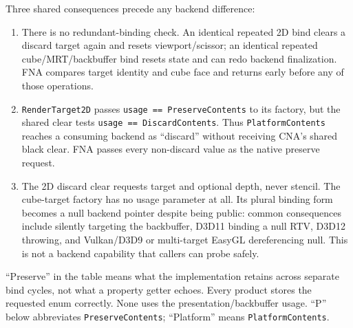 Three shared consequences precede any backend difference:

\begin{enumerate}
  \item There is no redundant-binding check. An identical repeated 2D bind clears a discard
        target again and resets viewport/scissor; an identical repeated cube/MRT/backbuffer
        bind resets state and can redo backend finalization. FNA compares target identity and
        cube face and returns early before any of those operations.
  \item \texttt{RenderTarget2D} passes
        \texttt{usage == PreserveContents} to its factory, but the shared clear tests
        \texttt{usage == DiscardContents}. Thus \texttt{PlatformContents} reaches a consuming
        backend as ``discard'' without receiving CNA's shared black clear. FNA passes every
        non-discard value as the native preserve request.
  \item The 2D discard clear requests target and optional depth, never stencil. The cube-target
        factory has no usage parameter at all. Its plural binding form becomes a null backend
        pointer despite being public: common consequences include silently targeting the
        backbuffer, D3D11 binding a null RTV, D3D12 throwing, and Vulkan/D3D9 or multi-target
        EasyGL dereferencing null. This is not a backend capability that callers can probe
        safely.
\end{enumerate}

``Preserve'' in the table means what the implementation retains across separate bind cycles,
not what a property getter echoes. Every product stores the requested enum correctly. None
uses the presentation/backbuffer usage. ``P'' below abbreviates \texttt{PreserveContents};
``Platform'' means \texttt{PlatformContents}.

